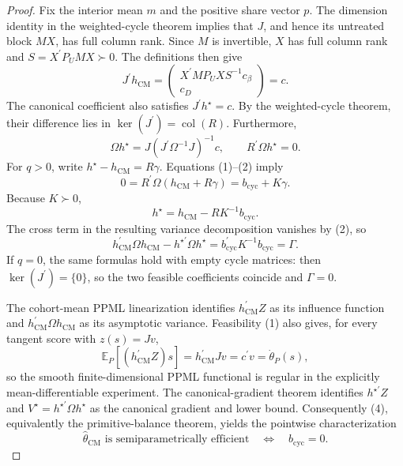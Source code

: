 \documentclass{article}
\begin{document}
\begin{proof}
Fix the interior mean \(m\) and the positive share vector \(p\).  The dimension identity in the weighted-cycle theorem implies that \(J\), and hence its untreated block \(MX\), has full column rank.  Since \(M\) is invertible, \(X\) has full column rank and
\(S=X^{\prime}P_UMX\succ0\).  The definitions then give
\[
J^{\prime}h_{\mathrm{CM}}
=\begin{pmatrix}
X^{\prime}MP_UXS^{-1}c_\beta\\c_D
\end{pmatrix}=c.                                                        \tag{1}
\]
The canonical coefficient also satisfies \(J^{\prime}h^{\star}=c\).  By the weighted-cycle theorem, their difference lies in
\(\ker(J^{\prime})=\operatorname{col}(R)\).  Furthermore,
\[
\Omega h^{\star}
=J(J^{\prime}\Omega^{-1}J)^{-1}c,
\qquad
R^{\prime}\Omega h^{\star}=0.                                         \tag{2}
\]
For \(q>0\), write \(h^{\star}-h_{\mathrm{CM}}=R\gamma\).  Equations (1)--(2) imply
\[
0=R^{\prime}\Omega(h_{\mathrm{CM}}+R\gamma)
=b_{\mathrm{cyc}}+K\gamma.
\]
Because \(K\succ0\),
\[
h^{\star}=h_{\mathrm{CM}}-RK^{-1}b_{\mathrm{cyc}}.                     \tag{3}
\]
The cross term in the resulting variance decomposition vanishes by (2), so
\[
h_{\mathrm{CM}}^{\prime}\Omega h_{\mathrm{CM}}
-h^{\star\prime}\Omega h^{\star}
=b_{\mathrm{cyc}}^{\prime}K^{-1}b_{\mathrm{cyc}}
=\Gamma.                                                               \tag{4}
\]
If \(q=0\), the same formulas hold with empty cycle matrices: then
\(\ker(J^{\prime})=\{0\}\), so the two feasible coefficients coincide and \(\Gamma=0\).

The cohort-mean PPML linearization identifies
\(h_{\mathrm{CM}}^{\prime}Z\) as its influence function and
\(h_{\mathrm{CM}}^{\prime}\Omega h_{\mathrm{CM}}\) as its asymptotic variance.  Feasibility (1) also gives, for every tangent score with \(z(s)=Jv\),
\[
\mathbb E_P[(h_{\mathrm{CM}}^{\prime}Z)s]
=h_{\mathrm{CM}}^{\prime}Jv=c^{\prime}v=\dot\theta_P(s),               \tag{5}
\]
so the smooth finite-dimensional PPML functional is regular in the explicitly mean-differentiable experiment.  The canonical-gradient theorem identifies \(h^{\star\prime}Z\) and
\(V^{\star}=h^{\star\prime}\Omega h^{\star}\) as the canonical gradient and lower bound.  Consequently (4), equivalently the primitive-balance theorem, yields the pointwise characterization
\[
\widehat\theta_{\mathrm{CM}}\text{ is semiparametrically efficient}
\quad\Longleftrightarrow\quad
b_{\mathrm{cyc}}=0.                                                     \tag{6}
\]


\end{proof}
\end{document}
